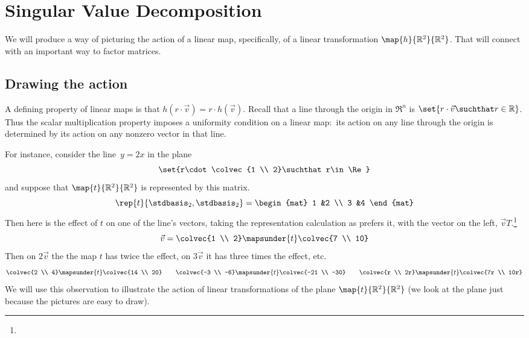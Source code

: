 \chapter{Singular Value Decomposition}
\label{chap:SingularValueDecomposition}

We will produce a way of picturing the action of a linear map,
specifically, of a linear transformation $\map{h}{\Re^2}{\Re^2}$.
That will connect with an important way to factor matrices.


\section{Drawing the action}
A defining property of linear maps is that 
$h(r\cdot\vec{v})=r\cdot h(\vec{v})$.
Recall that a line through the origin in $\Re^n$ is 
$\set{r\cdot \vec{v}\suchthat r\in\Re}$. 
Thus the scalar multiplication property  
imposes a uniformity condition on a linear map:~its action on any 
line through the origin is determined by its action
on any nonzero vector in that line.

For instance, consider the line~$y=2x$ in the plane
\begin{equation*}
  \set{r\cdot\colvec{1 \\ 2}\suchthat r\in\Re}
\end{equation*}
and suppose that $\map{t}{\Re^2}{\Re^2}$ is represented by this matrix.
\begin{equation*}
  \rep{t}{\stdbasis_2,\stdbasis_2}
  =
  \begin{mat}
    1 &2 \\
    3 &4
  \end{mat}
\end{equation*}
Then here is the effect of $t$ on one of the line's vectors,
taking the representation calculation as \Sage{} prefers it, 
with the vector on the left, $\vec{v}T$.\footnote{\noterightmult}
\begin{equation*}
  \vec{v}=\colvec{1 \\ 2}\mapsunder{t}\colvec{7 \\ 10}
\end{equation*}
Then on $2\vec{v}$ the 
the map $t$ has twice the effect, on  $3\vec{v}$ it has three times the
effect, etc.
\begin{equation*}
  \colvec{2 \\ 4}\mapsunder{t}\colvec{14 \\ 20}
  \qquad
  \colvec{-3 \\ -6}\mapsunder{t}\colvec{-21 \\ -30}
  \qquad
  \colvec{r \\ 2r}\mapsunder{t}\colvec{7r \\ 10r}
\end{equation*}
We will use this observation to illustrate the action of 
linear transformations of the plane $\map{t}{\Re^2}{\Re^2}$
(we look at the plane just because the pictures are 
easy to draw). 


